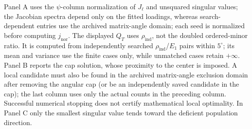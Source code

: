 \documentclass[12pt,letterpaper]{article}
\theoremstyle{plain}
\theoremstyle{definition}
\begin{document}
\begin{table}[p]
\begin{minipage}{0.96\linewidth}
Panel A uses the $\psi$-column normalization of $J_\ell$ and unsquared singular values; the Jacobian spectra depend only on the fitted loadings, whereas search-dependent entries use the archived matrix-angle domain; each seed is normalized before computing $j_{\mathrm{nor}}$. The displayed $Q_T$ uses $\rho_{\mathrm{ind}}$, not the doubled ordered-minor ratio. It is computed from independently searched $\rho_{\mathrm{ind}}$/$E_1$ pairs within $5^\circ$; its mean and variance use the finite cases only, while unmatched cases retain $+\infty$. Panel B reports the cap solution, whose proximity to the center is imposed. A local candidate must also be found in the archived matrix-angle exclusion domain after removing the angular cap (or be an independently saved candidate in the cap); the last column uses only the actual counts in the preceding column. Successful numerical stopping does not certify mathematical local optimality. In Panel C only the smallest singular value tends toward the deficient population direction.
\end{minipage}
\endgroup
\end{table}
\end{document}
